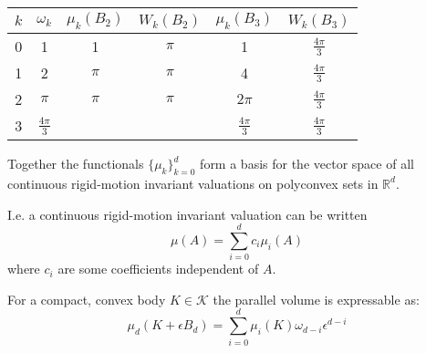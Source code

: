 \begin{center}
\begin{tabular}{cccccc}
  \toprule
  $k$ & $\omega_k$ & $\mu_k(B_2)$ & $W_k(B_2)$ & $\mu_k(B_3)$ & $W_k(B_3)$ \\
  \midrule
  0 & 1 & 1 & $\pi$ & 1 & $\frac{4\pi}{3}$ \\
  1 & 2 & $\pi$ & $\pi$ & 4 & $\frac{4\pi}{3}$ \\
  2 & $\pi$ & $\pi$ & $\pi$ & $2\pi$ & $\frac{4\pi}{3}$ \\
  3 & $\frac{4\pi}{3}$ &&& $\frac{4\pi}{3}$ & $\frac{4\pi}{3}$ \\
  \bottomrule
\end{tabular}
\end{center}

\begin{theorem}
  Together the functionals $\{\mu_k\}_{k=0}^d$ form a basis for the vector space of all continuous rigid-motion invariant valuations on polyconvex sets in $\mathbb{R}^d$.
\end{theorem}

I.e. a continuous rigid-motion invariant valuation can be written
\begin{equation}
  \mu(A) = \sum_{i=0}^d c_i \mu_i(A)
\end{equation}
where $c_i$ are some coefficients independent of $A$.

\begin{theorem}
  For a compact, convex body $K \in \mathcal{K}$ the parallel volume is expressable as:
  \begin{equation}
    \mu_d(K + \epsilon B_d) =
    \sum_{i=0}^d \mu_i(K) \omega_{d-i} \epsilon^{d-i}
  \end{equation}
\end{theorem}


